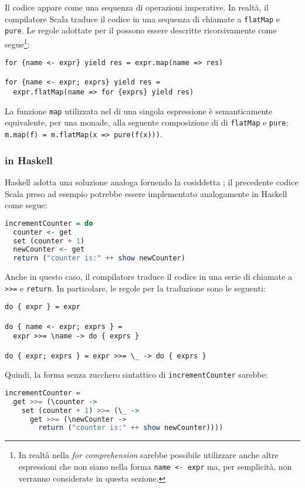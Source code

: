Il codice appare come una sequenza di operazioni imperative. In realtà, il compilatore Scala traduce il codice in una sequenza di chiamate a \lstinline{flatMap} e \lstinline{pure}.
Le regole adottate per il  possono essere descritte ricorsivamente come segue\footnote{In realtà nella \emph{for comprehension} sarebbe possibile utilizzare anche altre espressioni che non siano nella forma \lstinline{name <- expr} ma, per semplicità, non verranno considerate in questa sezione.}:

\begin{lstlisting}
for {name <- expr} yield res = expr.map(name => res)

for {name <- expr; exprs} yield res =
  expr.flatMap(name => for {exprs} yield res)
\end{lstlisting}

La funzione \lstinline{map} utilizzata nel  di una singola espressione è semanticamente equivalente, per una monade, alla seguente composizione di di \lstinline{flatMap} e \lstinline{pure}: \lstinline{m.map(f) = m.flatMap(x => pure(f(x)))}.

\subsubsection{ in Haskell}
Haskell adotta una soluzione analoga fornendo la cosiddetta ; il precedente codice Scala preso ad esempio potrebbe essere implementato analogamente in Haskell come segue:
\begin{lstlisting}[language=haskell]
incrementCounter = do
  counter <- get
  set (counter + 1)
  newCounter <- get
  return ("counter is:" ++ show newCounter)
\end{lstlisting}
Anche in questo caso, il compilatore traduce il codice in una serie di chiamate a \lstinline{>>=} e \lstinline{return}. In particolare, le regole per la traduzione sono le seguenti:
\begin{lstlisting}
do { expr } = expr

do { name <- expr; exprs } =
  expr >>= \name -> do { exprs }

do { expr; exprs } = expr >>= \_ -> do { exprs }
\end{lstlisting}

Quindi, la forma senza zucchero sintattico di \lstinline{incrementCounter} sarebbe:
\begin{lstlisting}[language=haskell]
incrementCounter =
  get >>= (\counter ->
    set (counter + 1) >>= (\_ ->
      get >>= (\newCounter ->
        return ("counter is:" ++ show newCounter))))
\end{lstlisting}

